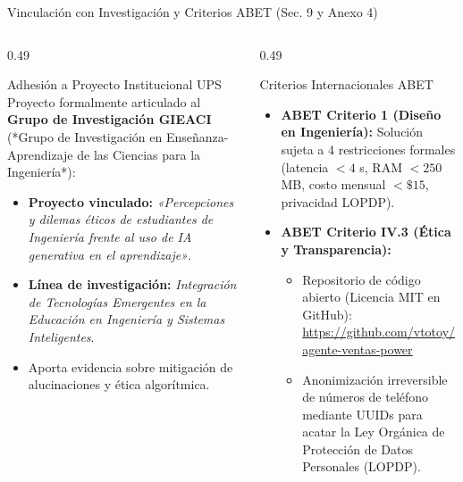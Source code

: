 \documentclass[aspectratio=169, 10pt]{beamer}
\begin{document}
\begin{frame}{Vinculación con Investigación y Criterios ABET (Sec. 9 y Anexo 4)}
  \begin{columns}[t]
    \begin{column}{0.49\textwidth}
      \begin{block}{Adhesión a Proyecto Institucional UPS}
        \footnotesize
        Proyecto formalmente articulado al \textbf{Grupo de Investigación GIEACI} (*Grupo de Investigación en Enseñanza-Aprendizaje de las Ciencias para la Ingeniería*):
        \begin{itemize}\scriptsize\setlength{\itemsep}{2pt}
          \item \textbf{Proyecto vinculado:} \textit{«Percepciones y dilemas éticos de estudiantes de Ingeniería frente al uso de IA generativa en el aprendizaje»}.
          \item \textbf{Línea de investigación:} \textit{Integración de Tecnologías Emergentes en la Educación en Ingeniería y Sistemas Inteligentes}.
          \item Aporta evidencia sobre mitigación de alucinaciones y ética algorítmica.
        \end{itemize}
      \end{block}
    \end{column}
    
    \begin{column}{0.49\textwidth}
      \begin{exampleblock}{Criterios Internacionales ABET}
        \footnotesize
        \begin{itemize}\scriptsize\setlength{\itemsep}{3pt}
          \item \textbf{ABET Criterio 1 (Diseño en Ingeniería):}
            Solución sujeta a 4 restricciones formales (latencia $<4$ s, RAM $<250$ MB, costo mensual $<\$15$, privacidad LOPDP).
          \item \textbf{ABET Criterio IV.3 (Ética y Transparencia):}
            \begin{itemize}\tiny
              \item Repositorio de código abierto (Licencia MIT en GitHub):\\
              \url{https://github.com/vtotoy/agente-ventas-power}
              \item Anonimización irreversible de números de teléfono mediante UUIDs para acatar la Ley Orgánica de Protección de Datos Personales (LOPDP).
            \end{itemize}
        \end{itemize}
      \end{exampleblock}
    \end{column}
  \end{columns}
\end{frame}
\end{document}
